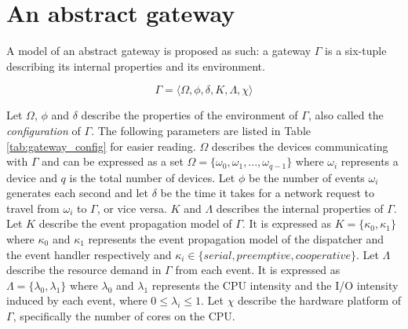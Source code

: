 \section{An abstract gateway}

A model of an abstract gateway is proposed as such: a gateway $\Gamma$ is a
six-tuple describing its internal properties and its environment.

\begin{equation}
\Gamma = \big \langle \Omega, \phi, \delta, K, \Lambda, \chi \big \rangle
\end{equation}

Let $\Omega$, $\phi$ and $\delta$ describe the properties of the environment of
$\Gamma$, also called the \textit{configuration} of $\Gamma$. The following
parameters are listed in Table \ref{tab:gateway_config} for easier reading.
$\Omega$ describes the devices communicating with $\Gamma$ and can be expressed
as a set $\Omega = \{ \omega_0, \omega_1, ..., \omega_{q-1} \}$ where
$\omega_i$ represents a device and $q$ is the total number of devices. Let
$\phi$ be the number of events $\omega_i$ generates each second and let
$\delta$ be the time it takes for a network request to travel from $\omega_i$
to $\Gamma$, or vice versa. $K$ and $\Lambda$ describes the internal properties
of $\Gamma$. Let $K$ describe the event propagation model of $\Gamma$. It is
expressed as $K = \{ \kappa_0, \kappa_1 \}$ where $\kappa_0$ and $\kappa_1$
represents the event propagation model of the dispatcher and the event handler
respectively and $\kappa_i \in \{ \textit{serial}, \textit{preemptive},
\textit{cooperative} \}$. Let $\Lambda$ describe the resource demand in
$\Gamma$ from each event. It is expressed as $\Lambda = \{ \lambda_0, \lambda_1
\}$ where $\lambda_0$ and $\lambda_1$ represents the CPU intensity and the I/O
intensity induced by each event, where $0 \leq \lambda_i \leq 1$. Let $\chi$
describe the hardware platform of $\Gamma$, specifically the number of cores on
the CPU.

